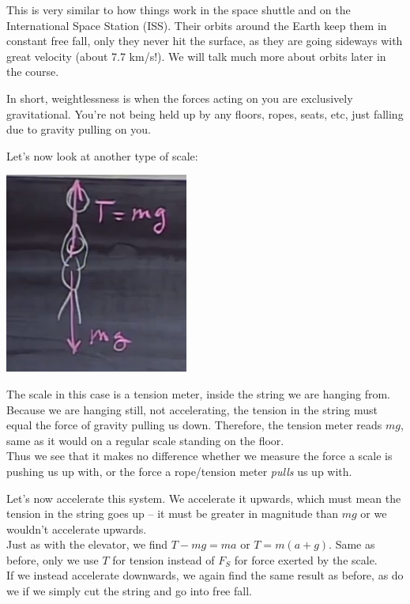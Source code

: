 \documentclass[12pt,a4paper]{report}
\begin{document}
This is very similar to how things work in the space shuttle and on the International Space Station (ISS). Their orbits around the Earth keep them in constant free fall, only they never hit the surface, as they are going sideways with great velocity (about 7.7 km/s!). We will talk much more about orbits later in the course.

In short, weightlessness is when the forces acting on you are exclusively gravitational. You're not being held up by any floors, ropes, seats, etc, just falling due to gravity pulling on you.

Let's now look at another type of scale:

\begin{center}
\includegraphics[scale=0.8]{Graphics/lec7_hanging}
\end{center}

The scale in this case is a tension meter, inside the string we are hanging from. Because we are hanging still, not accelerating, the tension in the string must equal the force of gravity pulling us down. Therefore, the tension meter reads $m g$, same as it would on a regular scale standing on the floor.\\
Thus we see that it makes no difference whether we measure the force a scale is pushing us up with, or the force a rope/tension meter \emph{pulls} us up with.

Let's now accelerate this system. We accelerate it upwards, which must mean the tension in the string goes up -- it must be greater in magnitude than $m g$ or we wouldn't accelerate upwards.\\
Just as with the elevator, we find $T - m g = m a$ or $T = m(a + g)$. Same as before, only we use $T$ for tension instead of $F_S$ for force exerted by the scale.\\
If we instead accelerate downwards, we again find the same result as before, as do we if we simply cut the string and go into free fall.
\end{document}
